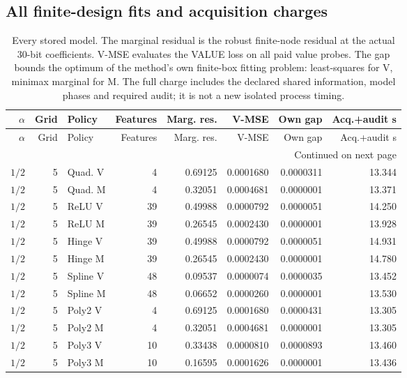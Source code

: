 \subsection{All finite-design fits and acquisition charges}

\begingroup
\small\setlength{\tabcolsep}{3pt}
\begin{longtable}{rrlrrrrr}
\caption{Every stored model. The marginal residual is the robust finite-node residual at the actual 30-bit coefficients. V-MSE evaluates the VALUE loss on all paid value probes. The gap bounds the optimum of the method's own finite-box fitting problem: least-squares for V, minimax marginal for M. The full charge includes the declared shared information, model phases and required audit; it is not a new isolated process timing.}\label{tab:allfits121}\\
\toprule
$\alpha$ & Grid & Policy & Features & Marg. res. & V-MSE & Own gap & Acq.+audit s\\
\midrule\endfirsthead
\toprule
$\alpha$ & Grid & Policy & Features & Marg. res. & V-MSE & Own gap & Acq.+audit s\\
\midrule\endhead
\midrule\multicolumn{8}{r}{Continued on next page}\\\endfoot
\bottomrule\endlastfoot
$1/2$ & 5 & Quad. V & 4 & 0.69125 & 0.0001680 & 0.0000311 & 13.344\\
$1/2$ & 5 & Quad. M & 4 & 0.32051 & 0.0004681 & 0.0000001 & 13.371\\
$1/2$ & 5 & ReLU V & 39 & 0.49988 & 0.0000792 & 0.0000051 & 14.250\\
$1/2$ & 5 & ReLU M & 39 & 0.26545 & 0.0002430 & 0.0000001 & 13.928\\
$1/2$ & 5 & Hinge V & 39 & 0.49988 & 0.0000792 & 0.0000051 & 14.931\\
$1/2$ & 5 & Hinge M & 39 & 0.26545 & 0.0002430 & 0.0000001 & 14.780\\
$1/2$ & 5 & Spline V & 48 & 0.09537 & 0.0000074 & 0.0000035 & 13.452\\
$1/2$ & 5 & Spline M & 48 & 0.06652 & 0.0000260 & 0.0000001 & 13.530\\
$1/2$ & 5 & Poly2 V & 4 & 0.69125 & 0.0001680 & 0.0000431 & 13.305\\
$1/2$ & 5 & Poly2 M & 4 & 0.32051 & 0.0004681 & 0.0000001 & 13.305\\
$1/2$ & 5 & Poly3 V & 10 & 0.33438 & 0.0000810 & 0.0000893 & 13.460\\
$1/2$ & 5 & Poly3 M & 10 & 0.16595 & 0.0001626 & 0.0000001 & 13.436\\

\end{longtable}
